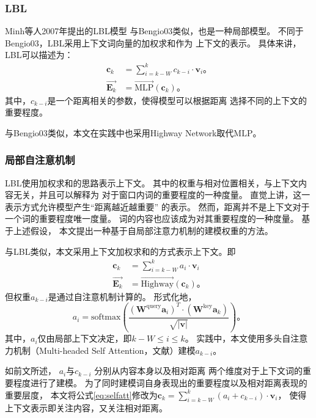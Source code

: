 \subsubsection{LBL}
Minh等人2007年提出的LBL模型\cite{Mnih:2007:TNG:1273496.1273577}
与Bengio03\cite{NIPS2000_1839}类似，也是一种局部模型。
不同于Bengio03，LBL采用上下文词向量的加权求和作为
上下文的表示。
具体来讲，LBL可以描述为：
\begin{align*}
\mathbf{c}_k & = \sum_{i=k-W}^k c_{k-i} \cdot \mathbf{v}_i \text{。} \\
\overrightarrow{\mathbf{E}_k} & = \overrightarrow{\text{MLP}}(\mathbf{c}_k)\text{。}
\end{align*}
其中，$c_{k-i}$是一个距离相关的参数，使得模型可以根据距离
选择不同的上下文的重要程度。

与Bengio03类似，本文在实践中也采用Highway Network取代$\text{MLP}$。

\subsubsection{局部自注意机制}
LBL使用加权求和的思路表示上下文。
其中的权重与相对位置相关，与上下文内容无关，并且可以解释为
对于窗口内词的重要程度的一种度量。
直觉上讲，这一表示方式允许模型产生``距离越近越重要''
的表示。
然而，距离并不是上下文对于一个词的重要程度唯一度量。
词的内容也应该成为对其重要程度的一种度量。
基于上述假设，
本文提出一种基于自局部注意力机制的建模权重的方法。

与LBL类似，本文采用上下文加权求和的方式表示上下文。即
\begin{align}
\mathbf{c}_k & = \sum_{i=k-W}^k a_i  \cdot \mathbf{v}_i  \label{eq:selfatt}\\
\overrightarrow{\mathbf{E}_k} & = \overrightarrow{\text{Highway}}(\mathbf{c}_k)\text{。}
\end{align}
但权重$a_{k-i}$是通过自注意机制\cite{DBLP:journals/corr/BahdanauBXGLPCB16,luong-pham-manning:2015:EMNLP,NIPS2017_7181}计算的。
形式化地，
\[
a_i= \text{softmax}(\frac{(\mathbf{W}^{\text{query}} \mathbf{a}_i)^T \cdot (\mathbf{W}^{\text{key}} \mathbf{a}_k)}{\sqrt{|\mathbf{v}|}})\text{。}
\]
其中，$a_i$仅由局部上下文决定，即$k-W \le i \le k$。
实践中，本文使用多头自注意力机制（Multi-headed Self Attention，文献）建模$a_{k-i}$。

如前文所述，
$a_i$与$c_{k-i}$
分别从内容本身以及相对距离
两个维度对于上下文词的重要程度进行了建模。
为了同时建模词自身表现出的重要程度以及相对距离表现的重要层度，
本文将公式\ref{eq:selfatt}修改为$\mathbf{c}_k = \sum_{i=k-W}^k (a_i + c_{k-i})  \cdot \mathbf{v}_i$，
使得上下文表示即关注内容，又关注相对距离。


